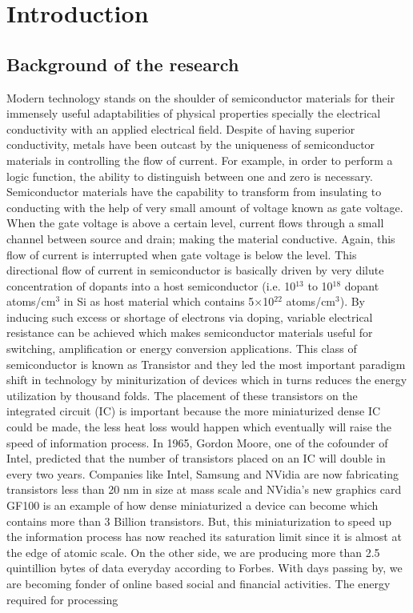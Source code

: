 \documentclass[main.tex]{subfiles}
\begin{document}
\chapter{Introduction}


\thispagestyle{empty}

\pagestyle{fancy}
\fancyhf{}

\lhead{\chaptername \ \thechapter}

\section{Background of the research}
Modern technology stands on the shoulder of semiconductor materials for their immensely useful adaptabilities of physical properties specially the electrical conductivity with an applied electrical field. Despite of having superior conductivity, metals have been outcast by the uniqueness of semiconductor materials in controlling the flow of current. For example, in order to perform a logic function, the ability to distinguish between one and zero is necessary. Semiconductor materials have the capability to transform from insulating to conducting with the help of very small amount of voltage known as gate voltage. When the gate voltage is above a certain level, current flows through a small channel between source and drain; making the material conductive. Again, this flow of current is interrupted when gate voltage is below the level. This directional flow of current in semiconductor is basically driven by very dilute concentration of dopants into a host semiconductor (i.e. 10$^{13}$ to 10$^{18}$ dopant atoms/cm$^{3}$ in Si as host material which contains 5$ \times $10$^{22}$ atoms/cm$^{3}$). By inducing such excess or shortage of electrons via doping, variable electrical resistance can be achieved which makes semiconductor materials useful for switching, amplification or energy conversion applications. This class of semiconductor is known as Transistor and they led the most important paradigm shift in technology by miniturization of devices which in turns reduces the energy utilization by thousand folds. The placement of these transistors on the integrated circuit (IC) is important because the more miniaturized dense IC could be made, the less heat loss would happen which eventually will raise the speed of information process. In 1965, Gordon Moore, one of the cofounder of Intel, predicted that the number of transistors placed on an IC will double in every two years. Companies like Intel, Samsung and NVidia are now fabricating transistors less than 20 nm in size at mass scale and NVidia’s new graphics card GF100 is an example of how dense miniaturized a device can become which contains more than 3 Billion transistors. But, this miniaturization to speed up the information process has now reached its saturation limit since it is almost at the edge of atomic scale. On the other side, we are producing more than 2.5 quintillion bytes of data everyday according to Forbes. With days passing by, we are becoming fonder of online based social and financial activities. The energy required for processing 
\end{document}
